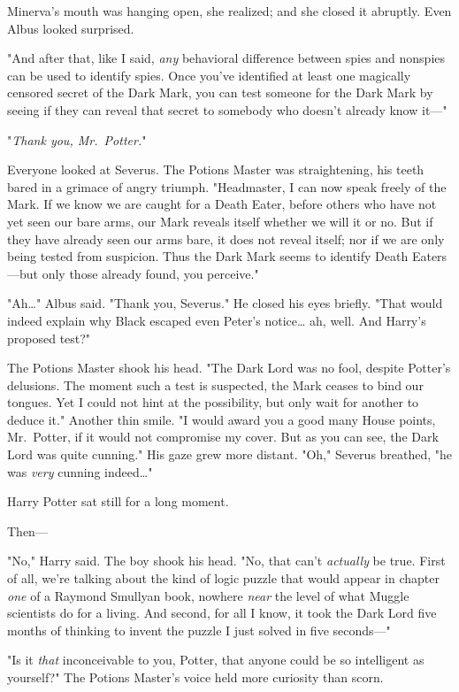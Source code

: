 Minerva's mouth was hanging open, she realized; and she closed it abruptly.
Even Albus looked surprised.

"And after that, like I said, \emph{any} behavioral difference between spies
and nonspies can be used to identify spies. Once you've identified at least one
magically censored secret of the Dark Mark, you can test someone for the Dark
Mark by seeing if they can reveal that secret to somebody who doesn't already
know it---"

"\emph{Thank you, Mr.~Potter.}"

Everyone looked at Severus. The Potions Master was straightening, his teeth
bared in a grimace of angry triumph. "Headmaster, I can now speak freely of the
Mark. If we know we are caught for a Death Eater, before others who have not
yet seen our bare arms, our Mark reveals itself whether we will it or no. But
if they have already seen our arms bare, it does not reveal itself; nor if we
are only being tested from suspicion. Thus the Dark Mark seems to identify
Death Eaters---but only those already found, you perceive."

"Ah{\ldots}" Albus said. "Thank you, Severus." He closed his eyes briefly.
"That would indeed explain why Black escaped even Peter's notice{\ldots} ah,
well. And Harry's proposed test?"

The Potions Master shook his head. "The Dark Lord was no fool, despite Potter's
delusions. The moment such a test is suspected, the Mark ceases to bind our
tongues. Yet I could not hint at the possibility, but only wait for another to
deduce it." Another thin smile. "I would award you a good many House points,
Mr.~Potter, if it would not compromise my cover. But as you can see, the Dark
Lord was quite cunning." His gaze grew more distant. "Oh," Severus breathed,
"he was \emph{very} cunning indeed{\ldots}"

Harry Potter sat still for a long moment.

Then---

"No," Harry said. The boy shook his head. "No, that can't \emph{actually} be
true. First of all, we're talking about the kind of logic puzzle that would
appear in chapter \emph{one} of a Raymond Smullyan book, nowhere \emph{near}
the level of what Muggle scientists do for a living. And second, for all I
know, it took the Dark Lord five months of thinking to invent the puzzle I just
solved in five seconds---"

"Is it \emph{that} inconceivable to you, Potter, that anyone could be so
intelligent as yourself?" The Potions Master's voice held more curiosity than
scorn.

